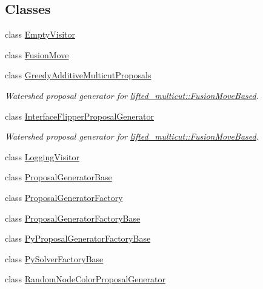 \subsection*{Classes}
\begin{DoxyCompactItemize}
\item 
class \hyperlink{classnifty_1_1graph_1_1opt_1_1common_1_1EmptyVisitor}{Empty\+Visitor}
\item 
class \hyperlink{classnifty_1_1graph_1_1opt_1_1common_1_1FusionMove}{Fusion\+Move}
\item 
class \hyperlink{classnifty_1_1graph_1_1opt_1_1common_1_1GreedyAdditiveMulticutProposals}{Greedy\+Additive\+Multicut\+Proposals}
\begin{DoxyCompactList}\small\item\em Watershed proposal generator for \hyperlink{classnifty_1_1graph_1_1opt_1_1lifted__multicut_1_1FusionMoveBased}{lifted\+\_\+multicut\+::\+Fusion\+Move\+Based}. \end{DoxyCompactList}\item 
class \hyperlink{classnifty_1_1graph_1_1opt_1_1common_1_1InterfaceFlipperProposalGenerator}{Interface\+Flipper\+Proposal\+Generator}
\begin{DoxyCompactList}\small\item\em Watershed proposal generator for \hyperlink{classnifty_1_1graph_1_1opt_1_1lifted__multicut_1_1FusionMoveBased}{lifted\+\_\+multicut\+::\+Fusion\+Move\+Based}. \end{DoxyCompactList}\item 
class \hyperlink{classnifty_1_1graph_1_1opt_1_1common_1_1LoggingVisitor}{Logging\+Visitor}
\item 
class \hyperlink{classnifty_1_1graph_1_1opt_1_1common_1_1ProposalGeneratorBase}{Proposal\+Generator\+Base}
\item 
class \hyperlink{classnifty_1_1graph_1_1opt_1_1common_1_1ProposalGeneratorFactory}{Proposal\+Generator\+Factory}
\item 
class \hyperlink{classnifty_1_1graph_1_1opt_1_1common_1_1ProposalGeneratorFactoryBase}{Proposal\+Generator\+Factory\+Base}
\item 
class \hyperlink{classnifty_1_1graph_1_1opt_1_1common_1_1PyProposalGeneratorFactoryBase}{Py\+Proposal\+Generator\+Factory\+Base}
\item 
class \hyperlink{classnifty_1_1graph_1_1opt_1_1common_1_1PySolverFactoryBase}{Py\+Solver\+Factory\+Base}
\item 
class \hyperlink{classnifty_1_1graph_1_1opt_1_1common_1_1RandomNodeColorProposalGenerator}{Random\+Node\+Color\+Proposal\+Generator}

\end{DoxyCompactItemize}
